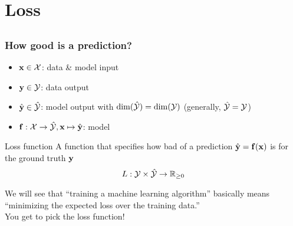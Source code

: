 \section{Loss}

\subsection{}

\begin{frame}
    \frametitle{How good is a prediction?}

    \begin{itemize}
        \item $\mathbf{x} \in \mathcal{X}$: data \& model input
        \item $\mathbf{y} \in \mathcal{Y}$: data output
        \item $\hat{\mathbf{y}} \in \hat{\mathcal{Y}}$: model output with $\dim(\hat{\mathcal{Y}}) = \dim(\mathcal{Y})$ (generally, $\hat{\mathcal{Y}} = \mathcal{Y}$)
        \item $\mathbf{f} : \mathcal{X} \to \hat{\mathcal{Y}}, \mathbf{x} \mapsto \hat{\mathbf{y}}$: model
    \end{itemize}
    \pause

    \begin{block}{Loss function}
        A function that specifies how bad of a prediction $\hat{\mathbf{y}} = \mathbf{f}(\mathbf{x})$ is for the ground truth $\mathbf{y}$
        \begin{equation*}
            L : \mathcal{Y} \times \hat{\mathcal{Y}} \to \mathbb{R}_{\ge 0}
        \end{equation*}
    \end{block}
    \pause

    We will see that ``training a machine learning algorithm'' basically means ``minimizing the expected loss over the training data.'' \\[1ex]

    You get to pick the loss function!
\end{frame}

